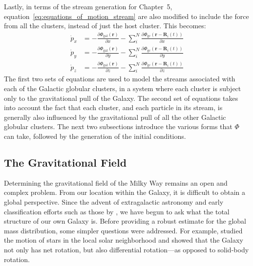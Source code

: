         Lastly, in terms of the stream generation for Chapter~5, equation~\ref{eq:equations_of_motion_stream} are also modified to include the force from all the clusters, instead of just the host cluster. This becomes: 
        \begin{equation}
            \begin{aligned}
                \dot{p}_{x} &= -\frac{\partial \Phi_\mathrm{gal}\left(\mathbf{r}\right)}{\partial x} - \sum_i^N \frac{\partial \Phi_\mathrm{gc}\left(\mathbf{r} - \mathbf{R}_i(t)\right)}{\partial x}\\
                \dot{p}_{y} &= -\frac{\partial \Phi_\mathrm{gal}\left(\mathbf{r}\right)}{\partial y} - \sum_i^N \frac{\partial \Phi_\mathrm{gc}\left(\mathbf{r} - \mathbf{R}_i(t)\right)}{\partial y}\\
                \dot{p}_{z} &= -\frac{\partial \Phi_\mathrm{gal}\left(\mathbf{r}\right)}{\partial z} - \sum_i^N \frac{\partial \Phi_\mathrm{gc}\left(\mathbf{r} - \mathbf{R}_i(t)\right)}{\partial z}
            \end{aligned}
        \end{equation}
        The first two sets of equations are used to model the streams associated with each of the Galactic globular clusters, in a system where each cluster is subject only to the gravitational pull of the Galaxy. The second set of equations takes into account the fact that each cluster, and each particle in its stream, is generally also influenced by the gravitational pull of all the other Galactic globular clusters. The next two subsections introduce the various forms that $\Phi$ can take, followed by the generation of the initial conditions. 
 

    \subsection{The Gravitational Field} \label{subsec:gravfield}
        Determining the gravitational field of the Milky Way remains an open and complex problem. From our location within the Galaxy, it is difficult to obtain a global perspective. Since the advent of extragalactic astronomy and early classification efforts such as those by \citet{1926ApJ....64..321H}, we have begun to ask what the total structure of our own Galaxy is. Before providing a robust estimate for the global mass distribution, some simpler questions were addressed. For example, \citet{1927BAN.....4...91O} studied the motion of stars in the local solar neighborhood and showed that the Galaxy not only has net rotation, but also differential rotation—as opposed to solid-body rotation.

